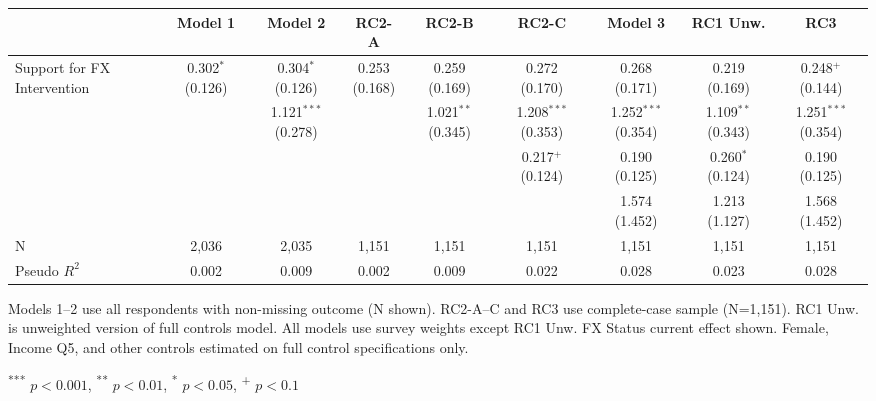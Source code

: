\documentclass{article}
\begin{document}
\begin{table}[h]
\centering
\begin{tabular}{l*{8}{c}}
\toprule
& Model 1 & Model 2 & RC2-A & RC2-B & RC2-C & Model 3 & RC1 Unw. & RC3 \\
\midrule
Support for FX Intervention & \makecell{0.302$^{*}$\\ (0.126)} & \makecell{0.304$^{*}$\\ (0.126)} & \makecell{0.253\\ (0.168)} & \makecell{0.259\\ (0.169)} & \makecell{0.272\\ (0.170)} & \makecell{0.268\\ (0.171)} & \makecell{0.219\\ (0.169)} & \makecell{0.248$^{+}$\\ (0.144)} \\
 &  & \makecell{1.121$^{***}$\\ (0.278)} &  & \makecell{1.021$^{**}$\\ (0.345)} & \makecell{1.208$^{***}$\\ (0.353)} & \makecell{1.252$^{***}$\\ (0.354)} & \makecell{1.109$^{**}$\\ (0.343)} & \makecell{1.251$^{***}$\\ (0.354)} \\
 &  &  &  &  & \makecell{0.217$^{+}$\\ (0.124)} & \makecell{0.190\\ (0.125)} & \makecell{0.260$^{*}$\\ (0.124)} & \makecell{0.190\\ (0.125)} \\
 &  &  &  &  &  & \makecell{1.574\\ (1.452)} & \makecell{1.213\\ (1.127)} & \makecell{1.568\\ (1.452)} \\
\midrule
N & 2,036 & 2,035 & 1,151 & 1,151 & 1,151 & 1,151 & 1,151 & 1,151 \\
Pseudo $R^2$ & 0.002 & 0.009 & 0.002 & 0.009 & 0.022 & 0.028 & 0.023 & 0.028 \\
\bottomrule
\end{tabular}

\vspace{1em}

\small
Models 1–2 use all respondents with non-missing outcome (N shown). RC2-A–C and RC3 use complete-case sample (N=1,151). RC1 Unw. is unweighted version of full controls model. All models use survey weights except RC1 Unw. FX Status current effect shown. Female, Income Q5, and other controls estimated on full control specifications only.

\noindent \textsuperscript{***} $p<0.001$, \textsuperscript{**} $p<0.01$, \textsuperscript{*} $p<0.05$, \textsuperscript{+} $p<0.1$
\end{table}
\end{document}
